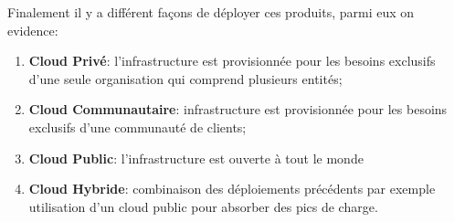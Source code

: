 \documentclass{article}
\begin{document}
Finalement il y a différent façons de déployer ces produits, parmi eux on evidence: 
\begin{enumerate}[rightmargin=\leftmargin]
    \item \textbf{Cloud Privé}: l'infrastructure est provisionnée pour les besoins exclusifs d'une seule organisation qui comprend plusieurs entités;
    \item \textbf{Cloud Communautaire}: infrastructure est provisionnée pour les besoins exclusifs d'une communauté de clients;
    \item \textbf{Cloud Public}: l'infrastructure est ouverte à tout le monde
    \item \textbf{Cloud Hybride}: combinaison des déploiements précédents par exemple utilisation d'un cloud public pour absorber des pics de charge.
\end{enumerate}




            
\end{document}
